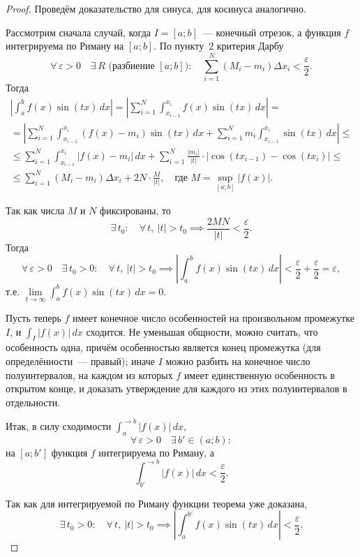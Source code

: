 \begin{proof}
Проведём доказательство для синуса, для косинуса аналогично.

Рассмотрим сначала случай, когда $I = [a;b]$~--- конечный отрезок, а функция $f$ интегрируема по Риману на $[a;b]$. По пункту~2 критерия Дарбу
$$
\forall\, \varepsilon > 0 \quad \exists\, R \text{ (разбиение $[a;b]$)}: \quad
\sum_{i=1}^{N} (M_i - m_i)\Delta x_i < \frac{\varepsilon}{2}.
$$
Тогда
\begin{multline*}
\left| \int_{a}^{b} f(x)\sin(tx)\,dx \right|
= \left| \sum_{i=1}^{N} \int_{x_{i-1}}^{x_i} f(x)\sin(tx)\,dx \right| = \\
= \left| \sum_{i=1}^{N} \int_{x_{i-1}}^{x_i} (f(x) - m_i)\sin(tx)\,dx
       + \sum_{i=1}^{N} m_i \int_{x_{i-1}}^{x_i} \sin(tx)\,dx \right| \le \\
\le \sum_{i=1}^{N} \int_{x_{i-1}}^{x_i} |f(x) - m_i|\,dx
  + \sum_{i=1}^{N} \frac{|m_i|}{|t|} \cdot |\cos(tx_{i-1}) - \cos(tx_i)| \le \\
\le \sum_{i=1}^{N} (M_i - m_i)\Delta x_i + 2N \cdot \frac{M}{|t|},
\quad \text{где } M = \sup_{[a;b]} |f(x)|.
\end{multline*}

Так как числа $M$ и $N$ фиксированы, то
$$
\exists\, t_0: \quad \forall\, t,\ |t| > t_0 \implies \frac{2MN}{|t|} < \frac{\varepsilon}{2}.
$$
Тогда
$$
\forall\, \varepsilon > 0 \quad \exists\, t_0 > 0: \quad
\forall\, t,\ |t| > t_0 \implies
\left| \int_{a}^{b} f(x)\sin(tx)\,dx \right| < \frac{\varepsilon}{2} + \frac{\varepsilon}{2} = \varepsilon,
$$
т.е. $\lim\limits_{t \to \infty} \int_{a}^{b} f(x)\sin(tx)\,dx = 0$.

\smallskip
Пусть теперь $f$ имеет конечное число особенностей на произвольном промежутке $I$, и $\int_I |f(x)|\,dx$ сходится. Не уменьшая общности, можно считать, что особенность одна, причём особенностью является конец промежутка (для определённости~--- правый); иначе $I$ можно разбить на конечное число полуинтервалов, на каждом из которых $f$ имеет единственную особенность в открытом конце, и доказать утверждение для каждого из этих полуинтервалов в отдельности.

Итак, в силу сходимости $\int_a^{\to b}|f(x)|\,dx$,
$$
\forall\, \varepsilon > 0 \quad \exists\, b' \in (a;b):
$$
на $[a;b']$ функция $f$ интегрируема по Риману, а
$$
\int_{b'}^{\to b}|f(x)|\,dx < \frac{\varepsilon}{2}.
$$

Так как для интегрируемой по Риману функции теорема уже доказана,
$$
\exists\, t_0 > 0: \quad \forall\, t,\ |t| > t_0 \implies
\left| \int_{a}^{b'} f(x)\sin(tx)\,dx \right| < \frac{\varepsilon}{2}.
$$


\end{proof}

